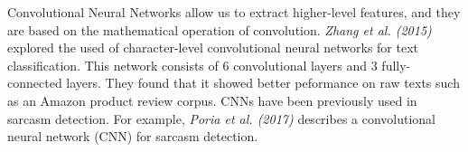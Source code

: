 \documentclass[12pt,a4paper]{article}
\begin{document}
Convolutional Neural Networks allow us to extract higher-level features, and they are based on the mathematical operation of convolution. \textit{Zhang et al. (2015)}  \cite{zhang2015character} explored the used of character-level convolutional neural networks for text classification. This network consists of 6 convolutional layers and 3 fully-connected layers. They found that it showed better peformance on raw texts such as an Amazon product review corpus. CNNs have been previously used in sarcasm detection. For example, \textit{Poria et al. (2017)} \cite{poria2016deeper} describes a convolutional neural network (CNN) for sarcasm detection. \\









\end{document}
